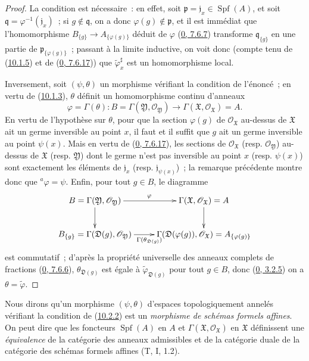 \begin{proof}
La condition est nécessaire~: en effet, soit
$\mathfrak{p}=\mathfrak{j}_x\in\operatorname{Spf}(A)$, et soit
$\mathfrak{q}=\varphi^{-1}(\mathfrak{j}_x)$~; si
$g\notin\mathfrak{q}$, on a donc $\varphi(g)\notin\mathfrak{p}$, et il est
immédiat que l'homomorphisme
$B_{\{g\}}\to A_{\{\varphi(g)\}}$ déduit de $\varphi$
(\hyperref[0.7.6.7-fr]{0, 7.6.7}) transforme
$\mathfrak{q}_{\{g\}}$ en une partie de
$\mathfrak{p}_{\{\varphi(g)\}}$~; passant à la limite inductive, on voit
donc (compte tenu de (\hyperref[I.10.1.5-fr]{10.1.5}) et de
(\hyperref[0.7.6.17-fr]{0, 7.6.17})) que
$\widetilde{\varphi}_x^\sharp$ est un homomorphisme local.

Inversement, soit $(\psi,\theta)$ un morphisme vérifiant la condition de
l'énoncé~; en vertu de (\hyperref[I.10.1.3-fr]{10.1.3}), $\theta$ définit
un homomorphisme continu d'anneaux
\[
  \varphi=\Gamma(\theta):
  B=\Gamma(\mathfrak{Y},\mathscr{O}_{\mathfrak{Y}})
  \longrightarrow
  \Gamma(\mathfrak{X},\mathscr{O}_{\mathfrak{X}})=A.
\]
En vertu de l'hypothèse sur $\theta$, pour que la section $\varphi(g)$ de
$\mathscr{O}_{\mathfrak{X}}$ au-dessus de $\mathfrak{X}$ ait un germe
inversible au point $x$, il faut et il suffit que $g$ ait un germe
inversible au point $\psi(x)$. Mais en vertu de
(\hyperref[0.7.6.17-fr]{0, 7.6.17}), les sections de
$\mathscr{O}_{\mathfrak{X}}$ (resp. $\mathscr{O}_{\mathfrak{Y}}$)
au-dessus de $\mathfrak{X}$ (resp. $\mathfrak{Y}$) dont le germe n'est pas
inversible au point $x$ (resp. $\psi(x)$) sont exactement les éléments de
$\mathfrak{j}_x$
(resp. $\mathfrak{j}_{\psi(x)}$)~; la remarque précédente montre donc que
${}^a\varphi=\psi$. Enfin, pour tout $g\in B$, le diagramme
\[
  \xymatrix{
    B=\Gamma(\mathfrak{Y},\mathscr{O}_{\mathfrak{Y}})
      \ar[r]^\varphi\ar[d] &
    \Gamma(\mathfrak{X},\mathscr{O}_{\mathfrak{X}})=A\ar[d]\\
    B_{\{g\}}=\Gamma(\mathfrak{D}(g),\mathscr{O}_{\mathfrak{Y}})
      \ar[r]_{\Gamma(\theta_{\mathfrak{D}(g)})} &
    \Gamma(\mathfrak{D}(\varphi(g)),\mathscr{O}_{\mathfrak{X}})
      =A_{\{\varphi(g)\}}
  }
\]
est commutatif~; d'après la propriété universelle des anneaux complets de
fractions (\hyperref[0.7.6.6-fr]{0, 7.6.6}),
$\theta_{\mathfrak{D}(g)}$ est égale à
$\widetilde{\varphi}_{\mathfrak{D}(g)}$ pour tout $g\in B$, donc
(\hyperref[0.3.2.5-fr]{0, 3.2.5}) on a
$\theta=\widetilde{\varphi}$.
\end{proof}

Nous dirons qu'un morphisme $(\psi,\theta)$ d'espaces topologiquement
annelés vérifiant la condition de (\hyperref[I.10.2.2-fr]{10.2.2}) est un
\emph{morphisme de schémas formels affines}. On peut dire que les foncteurs
$\operatorname{Spf}(A)$ en $A$ et
$\Gamma(\mathfrak{X},\mathscr{O}_{\mathfrak{X}})$ en $\mathfrak{X}$
définissent une \emph{équivalence} de la catégorie des anneaux admissibles
et de la catégorie duale de la catégorie des schémas formels affines
(T, I, 1.2).

